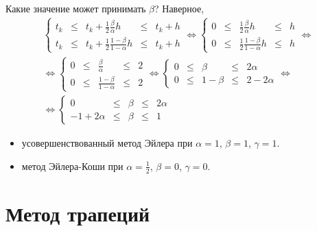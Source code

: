 \documentclass[a4paper,12pt]{article}
\begin{document}
Какие значение может принимать $\beta$? Наверное,
\begin{gather*}
    \left \{
    \begin{array}{ccccc}
        t_k & \le & t_k + \frac{1}{2} \frac{\beta}{\alpha} h         & \le & t_k + h \\
        t_k & \le & t_k + \frac{1}{2} \frac{1 - \beta}{1 - \alpha} h & \le & t_k + h
    \end{array}
    \right .
    \Leftrightarrow
    \left \{
    \begin{array}{ccccc}
        0 & \le & \frac{1}{2} \frac{\beta}{\alpha} h         & \le & h \\
        0 & \le & \frac{1}{2} \frac{1 - \beta}{1 - \alpha} h & \le & h
    \end{array}
    \right .
    \Leftrightarrow \\
    \Leftrightarrow
    \left \{
    \begin{array}{ccccc}
        0 & \le & \frac{\beta}{\alpha}         & \le & 2 \\
        0 & \le & \frac{1 - \beta}{1 - \alpha} & \le & 2
    \end{array}
    \right .
    \Leftrightarrow
    \left \{
    \begin{array}{ccccc}
        0 & \le & \beta     & \le & 2 \alpha     \\
        0 & \le & 1 - \beta & \le & 2 - 2 \alpha
    \end{array}
    \right .
    \Leftrightarrow \\
    \Leftrightarrow
    \left \{
    \begin{array}{ccccc}
        0             & \le & \beta & \le & 2 \alpha \\
        -1 + 2 \alpha & \le & \beta & \le & 1
    \end{array}
    \right .
\end{gather*}

\begin{itemize}
    \item усовершенствованный метод Эйлера при $\alpha = 1$, $\beta = 1$, $\gamma = 1$.
    \item метод Эйлера-Коши при $\alpha = \frac{1}{2}$, $\beta = 0$, $\gamma = 0$.
\end{itemize}

\section{Метод трапеций}
\end{document}

